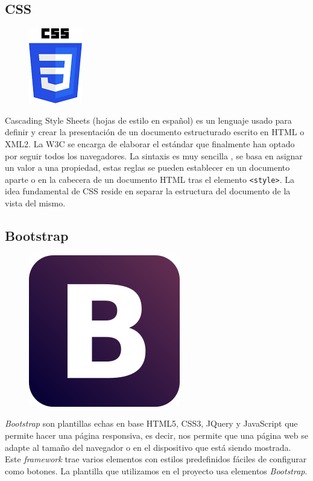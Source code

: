 \subsection{CSS}
\label{subsec:css}
\begin{figure}[h]
    \centering
    \includegraphics[scale=0.7]{img/logo_css.png}
    \label{fig:logoCss}
\end{figure}
Cascading Style Sheets (hojas de estilo en español) es un lenguaje usado para definir y crear la presentación de un documento estructurado escrito en HTML o XML2. La W3C se encarga de elaborar el estándar que finalmente han optado por seguir todos los navegadores. La sintaxis es muy sencilla , se basa en asignar un valor a una propiedad, estas reglas se pueden establecer en un documento aparte o en la cabecera de un documento HTML tras el elemento \texttt{<style>}. La idea fundamental de CSS reside en separar la estructura del documento de la vista del mismo.

\subsection{Bootstrap}
\label{subsec:boot}
\begin{figure}[H]
    \centering
    \includegraphics[scale=0.3]{./img/logo_bootstrap.png}
    \label{fig:logoBoot}
\end{figure}
\emph{Bootstrap} son plantillas echas en base HTML5, CSS3, JQuery y JavaScript que permite hacer una página responsiva, es decir, nos permite que una página web se adapte al tamaño del navegador  o en el dispositivo que está siendo mostrada. Este \emph{framework} trae varios elementos con estilos predefinidos fáciles de configurar como botones. La plantilla que utilizamos en el proyecto usa elementos \emph{Bootstrap}.
